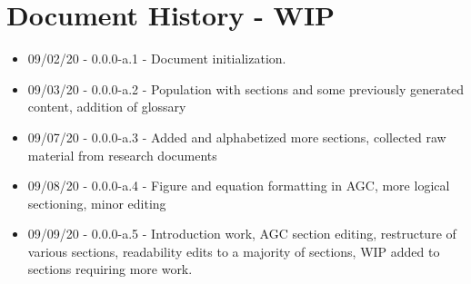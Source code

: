 \chapter{Document History  - WIP}

\begin{itemize}
\itemsep 0em
\item 09/02/20 - 0.0.0-a.1 - Document initialization.
\item 09/03/20 - 0.0.0-a.2 - Population with sections and some previously generated content, addition of glossary
\item 09/07/20 - 0.0.0-a.3 - Added and alphabetized more sections, collected raw material from research documents
\item 09/08/20 - 0.0.0-a.4 - Figure and equation formatting in AGC, more logical sectioning, minor editing
\item 09/09/20 - 0.0.0-a.5 - Introduction work, AGC section editing, restructure of various sections, readability edits to a majority of sections, WIP added to sections requiring more work.
\end{itemize}